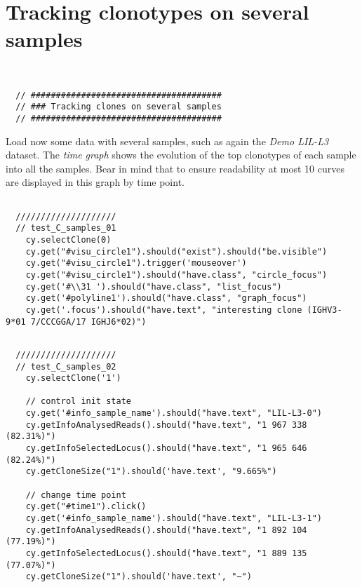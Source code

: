 

\section{Tracking clonotypes on several samples}

\label{sec:tracking}
\begin{verbatim}


  // ######################################
  // ### Tracking clones on several samples
  // ######################################

\end{verbatim}

Load now some data with several samples, such as again the \textit{Demo LIL-L3} dataset.
The \textit{time graph} shows the evolution of the top clonotypes of each sample into all the samples.
Bear in mind that to ensure readability at most 10 curves are displayed in this graph by time point.

\begin{verbatim}

  ////////////////////
  // test_C_samples_01
    cy.selectClone(0)
    cy.get("#visu_circle1").should("exist").should("be.visible")
    cy.get("#visu_circle1").trigger('mouseover')
    cy.get("#visu_circle1").should("have.class", "circle_focus")
    cy.get('#\\31 ').should("have.class", "list_focus")
    cy.get('#polyline1').should("have.class", "graph_focus")
    cy.get('.focus').should("have.text", "interesting clone (IGHV3-9*01 7/CCCGGA/17 IGHJ6*02)")


\end{verbatim}

\begin{verbatim}
  ////////////////////
  // test_C_samples_02
    cy.selectClone('1')

    // control init state
    cy.get('#info_sample_name').should("have.text", "LIL-L3-0")
    cy.getInfoAnalysedReads().should("have.text", "1 967 338 (82.31%)")
    cy.getInfoSelectedLocus().should("have.text", "1 965 646 (82.24%)")
    cy.getCloneSize("1").should('have.text', "9.665%")

    // change time point
    cy.get("#time1").click()
    cy.get('#info_sample_name').should("have.text", "LIL-L3-1")
    cy.getInfoAnalysedReads().should("have.text", "1 892 104 (77.19%)")
    cy.getInfoSelectedLocus().should("have.text", "1 889 135 (77.07%)")
    cy.getCloneSize("1").should('have.text', "−")


\end{verbatim}

